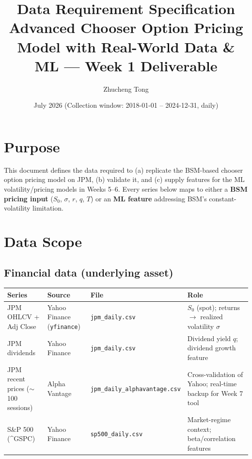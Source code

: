 \documentclass[11pt]{article}
\title{\textbf{Data Requirement Specification}\\
\large Advanced Chooser Option Pricing Model with Real-World Data \& ML --- Week 1 Deliverable}
\author{Zhucheng Tong}
\date{July 2026 \quad (Collection window: 2018-01-01 -- 2024-12-31, daily)}
\begin{document}
\maketitle

\section{Purpose}
This document defines the data required to (a) replicate the BSM-based chooser
option pricing model on JPM, (b) validate it, and (c) supply features for the
ML volatility/pricing models in Weeks 5--6. Every series below maps to either a
\textbf{BSM pricing input} ($S_0$, $\sigma$, $r$, $q$, $T$) or an \textbf{ML
feature} addressing BSM's constant-volatility limitation.

\section{Data Scope}

\subsection{Financial data (underlying asset)}
\begin{center}
\small
\begin{tabular}{p{3.3cm} p{2.5cm} p{3.9cm} p{4.3cm}}
\toprule
\textbf{Series} & \textbf{Source} & \textbf{File} & \textbf{Role} \\
\midrule
JPM OHLCV + Adj Close & Yahoo Finance (\texttt{yfinance}) & \texttt{jpm\_daily.csv} & $S_0$ (spot); returns $\to$ realized volatility $\sigma$ \\
JPM dividends & Yahoo Finance & \texttt{jpm\_daily.csv} & Dividend yield $q$; dividend growth feature \\
JPM recent prices ($\sim$100 sessions) & Alpha Vantage & \texttt{jpm\_daily\_\newline alphavantage.csv} & Cross-validation of Yahoo; real-time backup for Week 7 tool \\
S\&P 500 (\^{}GSPC) & Yahoo Finance & \texttt{sp500\_daily.csv} & Market-regime context; beta/correlation features \\
\bottomrule
\end{tabular}
\end{center}
\end{document}
